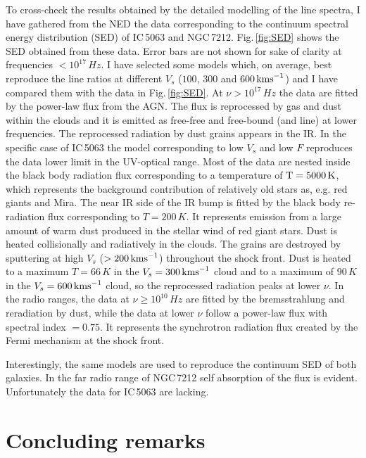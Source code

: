 \documentclass[../thesis.tex]{subfiles}
\begin{document}
To cross-check the results obtained by the detailed modelling of the line spectra, I have gathered from the NED the data corresponding to the continuum spectral energy distribution (SED) of IC\,5063 and NGC\,7212. 
Fig.\,\ref{fig:SED} shows the SED obtained from these data. 
Error bars are not shown for sake of clarity at frequencies $< 10^{17}\,\si{Hz}$.
I have selected some models which, on average, best reproduce the line ratios at different   $V_s$ ($100$, $300$ and $600 \,\si{\kms}$) and I have compared them with the data in Fig.\,\ref{fig:SED}.
At $\nu>10^{17}\,\si{Hz}$ the data are fitted by the power-law flux from the AGN.
The flux is reprocessed by gas and dust within the clouds and it is emitted as free-free and free-bound (and line) at lower frequencies. 
The reprocessed radiation by dust grains appears in the IR.
In the specific case of IC\,5063 the model corresponding to low $V_s$ and low $F$ reproduces the data lower limit in the UV-optical range.
Most of the data are nested inside the black body radiation flux corresponding to a temperature of $\rm T=5000\,\si{K}$, which represents the background contribution of relatively old stars as, e.g. red giants and Mira. 
The near IR side of the IR bump is fitted by the black body re-radiation flux corresponding to $ T=200\,\si{K}$. 
It represents emission from a large amount of warm dust produced in the stellar wind of red giant stars. 
Dust is heated collisionally and radiatively in the clouds.
The grains are destroyed by sputtering at high   $V_s$ ($> 200 \,\si{\kms}$) throughout the shock front.
Dust is heated to a maximum $T=66\,\si{K}$ in the $V_s =300 \,\si{\kms}$ cloud and to a maximum of $90\,\si{K}$ in the $V_s=600 \,\si{\kms}$ cloud, so the reprocessed radiation peaks at lower $\nu$. 
In the radio ranges, the data at $\nu\geq 10^{10}\,\si{Hz}$ are fitted by the bremsstrahlung and reradiation by dust, while the data at lower $\nu$ follow a power-law flux with spectral index $=0.75$. 
It represents the synchrotron radiation flux created by the Fermi mechanism at the shock front.

Interestingly, the same models are used to reproduce the continuum SED of  both galaxies.
In the far radio range of NGC\,7212 self absorption of the flux is evident. 
Unfortunately the data for IC\,5063 are lacking.


\section{Concluding remarks}
\label{sec:conclusions}
\end{document}

